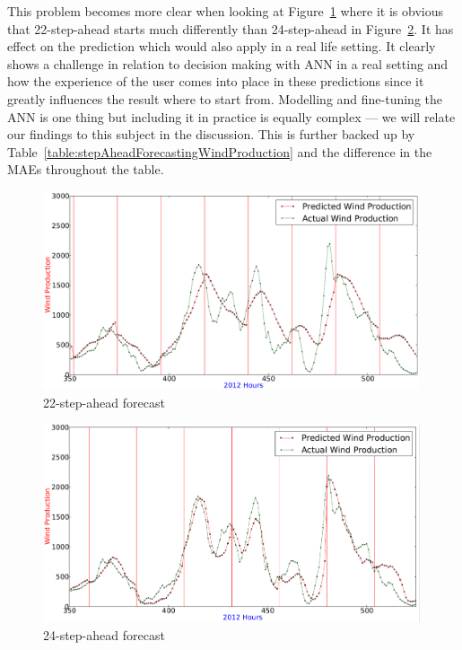 This problem becomes more clear when looking at Figure~\ref{fig:best22vsbest24Ahead} where it is obvious that 22-step-ahead starts much differently than 24-step-ahead in Figure~\ref{fig:best24AheadPredictionWithLines}. It has effect on the prediction which would also apply in a real life setting. It clearly shows a challenge in relation to decision making with ANN in a real setting and how the experience of the user comes into place in these predictions since it greatly influences the result where to start from. Modelling and fine-tuning the ANN is one thing but including it in practice is equally complex --- we will relate our findings to this subject in the discussion. This is further backed up by Table~\ref{table:stepAheadForecastingWindProduction} and the difference in the MAEs throughout the table.

\begin{figure}[H]
\centering
\includegraphics[width=0.99\textwidth]{billeder/best22vsbest24Ahead.png}
\caption{22-step-ahead forecast}
\label{fig:best22vsbest24Ahead}
\end{figure}

\begin{figure}[H]
\centering
\includegraphics[width=0.99\textwidth]{billeder/best24AheadPredictionWithLines.png}
\caption{24-step-ahead forecast}
\label{fig:best24AheadPredictionWithLines}
\end{figure} 

